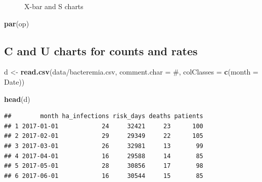 \documentclass[
]{book}
\makeatletter
\newenvironment{Shaded}{\begin{snugshade}}{\end{snugshade}}
\newcommand{\AttributeTok}[1]{\textcolor[rgb]{0.13,0.29,0.53}{#1}}
\newcommand{\FunctionTok}[1]{\textcolor[rgb]{0.13,0.29,0.53}{\textbf{#1}}}
\newcommand{\NormalTok}[1]{#1}
\newcommand{\OtherTok}[1]{\textcolor[rgb]{0.56,0.35,0.01}{#1}}
\newcommand{\StringTok}[1]{\textcolor[rgb]{0.31,0.60,0.02}{#1}}
\newcommand*\pandocbounded[1]{%
  \sbox\pandoc@box{#1}%
  \Gscale@div\@tempa{\textheight}{\dimexpr\ht\pandoc@box+\dp\pandoc@box\relax}%
  \Gscale@div\@tempb{\linewidth}{\wd\pandoc@box}%
  \ifdim\@tempb\p@<\@tempa\p@\let\@tempa\@tempb\fi%
  \ifdim\@tempa\p@<\p@\scalebox{\@tempa}{\usebox\pandoc@box}%
  \else\usebox{\pandoc@box}%
  \fi%
}
\makeatother
\begin{document}
\begin{figure}
\centering
\pandocbounded{}
\caption{X-bar and S charts}
\end{figure}

\begin{Shaded}
\begin{Highlighting}[]
\FunctionTok{par}\NormalTok{(op)}
\end{Highlighting}
\end{Shaded}

\subsection{C and U charts for counts and
rates}\label{c-and-u-charts-for-counts-and-rates}

\begin{Shaded}
\begin{Highlighting}[]
\NormalTok{d }\OtherTok{\textless{}{-}} \FunctionTok{read.csv}\NormalTok{(}\StringTok{\textquotesingle{}data/bacteremia.csv\textquotesingle{}}\NormalTok{,}
         \AttributeTok{comment.char =} \StringTok{\textquotesingle{}\#\textquotesingle{}}\NormalTok{,}
         \AttributeTok{colClasses   =} \FunctionTok{c}\NormalTok{(}\AttributeTok{month =} \StringTok{\textquotesingle{}Date\textquotesingle{}}\NormalTok{))}

\FunctionTok{head}\NormalTok{(d)}
\end{Highlighting}
\end{Shaded}

\begin{verbatim}
##        month ha_infections risk_days deaths patients
## 1 2017-01-01            24     32421     23      100
## 2 2017-02-01            29     29349     22      105
## 3 2017-03-01            26     32981     13       99
## 4 2017-04-01            16     29588     14       85
## 5 2017-05-01            28     30856     17       98
## 6 2017-06-01            16     30544     15       85
\end{verbatim}
\end{document}
